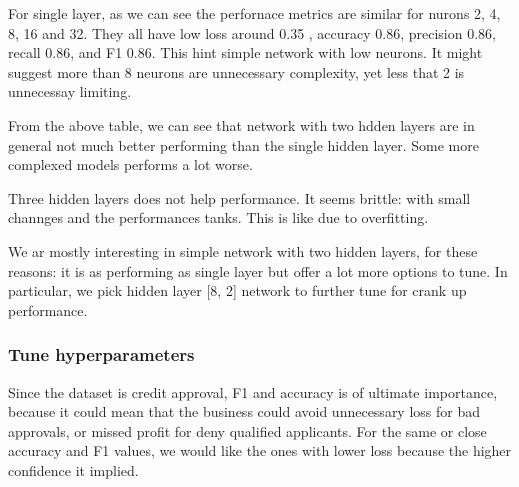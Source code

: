 For single layer, as we can see the perfornace metrics are similar for nurons 2, 4, 8, 16 and 32. They all have low loss around 0.35 , accuracy 0.86, precision 0.86, recall 0.86, and F1 0.86.  This hint simple network with low neurons. It might suggest more than 8 neurons are unnecessary complexity, yet less that 2 is unnecessay limiting.

From the above table, we can see that network with two hdden layers are in general not much better performing than the single hidden layer. Some more complexed models performs a lot worse. 

Three hidden layers does not help performance. It seems brittle: with small channges and the performances tanks.  This is like due to overfitting. 

We ar mostly interesting in simple network with two hidden layers, for these reasons: it is as performing as single layer but offer a lot more options to tune. In particular, we pick hidden layer [8, 2] network to further tune for crank up performance.  

\subsubsection{Tune hyperparameters}

Since the dataset is credit approval, F1 and accuracy is of ultimate importance, because it could mean that the business could avoid unnecessary loss for bad approvals, or missed profit for deny qualified applicants. For the same or close accuracy and F1 values, we would like the ones with lower loss because the higher confidence it implied.  


